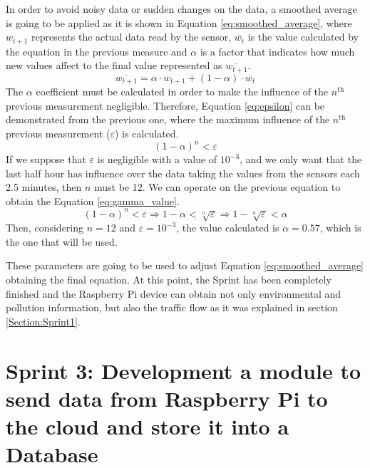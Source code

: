 In order to avoid noisy data or sudden changes on the data, a smoothed average is going to be applied as it is shown in Equation \ref{eq:smoothed_average}, where ${w}_{t+1}$ represents the actual data read by the sensor, $\overline{{w}_{t}}$ is the value calculated by the equation in the previous measure and $\alpha$ is a factor that indicates how much new values affect to the final value represented as $\overline{{w}_{t+1}}$.
\begin{equation} \label{eq:smoothed_average}
\overline { { w }_{ t+1 } } =\alpha \cdot { w }_{ t+1 }+(1-\alpha )\cdot \overline { { w }_{ t } } 
\end{equation}
The $\alpha$ coefficient must be calculated in order to make the influence of the $n^\text{th}$ previous measurement negligible. Therefore, Equation \ref{eq:epsilon} can be demonstrated from the previous one, where the maximum influence of the $n^\text{th}$ previous measurement ($\varepsilon$) is calculated.
\begin{equation} \label{eq:epsilon}
{ (1-\alpha ) }^{ n }<\varepsilon  
\end{equation}
If we suppose that $\varepsilon$ is negligible with a value of ${10}^{-3}$, and we only want that the last half hour has influence over the data taking the values from the sensors each 2.5 minutes, then $n$ must be 12. We can operate on the previous equation to obtain the Equation \ref{eq:gamma_value}.
\begin{equation} \label{eq:gamma_value}
{ (1-\alpha ) }^{ n }<\varepsilon \Rightarrow 1-\alpha <\sqrt [ n ]{ \varepsilon } \Rightarrow 1-\sqrt [ n ]{ \varepsilon }<\alpha
\end{equation}
Then, considering $n=12$ and $\varepsilon={10}^{-3}$, the value calculated is $\alpha=0.57$, which is the one that will be used.

These parameters are going to be used to adjust Equation \ref{eq:smoothed_average} obtaining the final equation. At this point, the Sprint has been completely finished and the Raspberry Pi device can obtain not only environmental and pollution information, but also the traffic flow as it was explained in section \ref{Section:Sprint1}.


\section{Sprint 3: Development a module to send data from Raspberry Pi to the cloud and store it into a Database}

